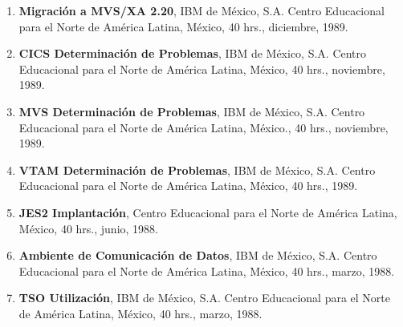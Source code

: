 \begin{enumerate}
\item \textbf{Migración a MVS/XA 2.20}, IBM de México, S.A. Centro Educacional para el Norte de América Latina, México, 40 hrs., diciembre, 1989.

\item \textbf{CICS Determinación de Problemas}, IBM de México, S.A. Centro Educacional para el Norte de América Latina, México, 40 hrs., noviembre, 
1989.

\item \textbf{MVS Determinación de Problemas}, IBM de México, S.A. Centro Educacional para el Norte de América Latina, México., 40 hrs., noviembre, 1989.

\item \textbf{VTAM Determinación de Problemas}, IBM de México, S.A. Centro Educacional para el Norte de América Latina, México, 40 hrs., 1989.

\item \textbf{JES2 Implantación}, Centro Educacional para el Norte de América Latina, México, 40 hrs., junio, 1988.

\item \textbf{Ambiente de Comunicación de Datos}, IBM de México, S.A. Centro Educacional para el Norte de América Latina, México, 40 hrs., marzo, 1988. 

\item \textbf{TSO Utilización}, IBM de México, S.A. Centro Educacional para el Norte de América Latina, México, 40 hrs., marzo, 1988.

\end{enumerate}



